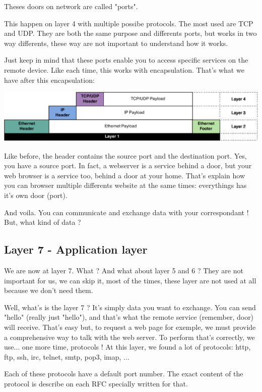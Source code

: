 \documentclass{article}
\begin{document}
	Theses doors on network are called "ports".
	
	This happen on layer 4 with multiple possibe protocols. The most used are TCP and UDP. They are both the same purpose
	and differents ports, but works in two way differents, these way are not important to understand how it works.
	
	Just keep in mind that these ports enable you to access specific services on the remote device. Like each time,
	this works with encapsulation. That's what we have after this encapsulation:
	\begin{center}
	\includegraphics[scale=0.3]{content/layer4.eps}
	\end{center}
	
	Like before, the header contains the source port and the destination port. Yes, you have a source port. In fact,
	a webserver is a service behind a door, but your web browser is a service too, behind a door at your home.
	That's explain how you can browser multiple differents website at the same times: everythings has it's own door (port).
	
	And voila. You can communicate and exchange data with your correspondant ! But, what kind of data ?
	
	\subsection{Layer 7 - Application layer}
	
	We are now at layer 7. What ? And what about layer 5 and 6 ? They are not important for us, we can skip it, most
	of the times, these layer are not used at all because we don't need them.
	
	Well, what's is the layer 7 ? It's simply data you want to exchange. You can send "hello" (really just "hello"),
	and that's what the remote service (remember, door) will receive. That's easy but, to request a web page for exemple,
	we must provide a comprehensive way to talk with the web server. To perform that's correctly, we use... one more time,
	protocols ! At this layer, we found a lot of protocols: http, ftp, ssh, irc, telnet, smtp, pop3, imap, ...
	
	Each of these protocols have a default port number. The exact content of the protocol is describe on each RFC
	specially written for that.
	
\end{document}
